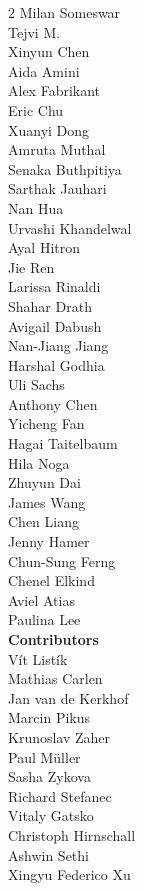 \begin{multicols}{2}
Milan Someswar \\
Tejvi M. \\
Xinyun Chen \\
Aida Amini \\
Alex Fabrikant \\
Eric Chu \\
Xuanyi Dong \\
Amruta Muthal \\
Senaka Buthpitiya \\
Sarthak Jauhari \\
Nan Hua \\
Urvashi Khandelwal \\
Ayal Hitron \\
Jie Ren \\
Larissa Rinaldi \\
Shahar Drath \\
Avigail Dabush \\
Nan-Jiang Jiang \\
Harshal Godhia \\
Uli Sachs \\
Anthony Chen \\
Yicheng Fan \\
Hagai Taitelbaum \\
Hila Noga \\
Zhuyun Dai \\
James Wang \\
Chen Liang \\
Jenny Hamer \\
Chun-Sung Ferng \\
Chenel Elkind \\
Aviel Atias \\
Paulina Lee \\
\textbf{Contributors} \\
Vít Listík \\
Mathias Carlen \\
Jan van de Kerkhof \\
Marcin Pikus \\
Krunoslav Zaher \\
Paul Müller \\
Sasha Zykova \\
Richard Stefanec \\
Vitaly Gatsko \\
Christoph Hirnschall \\
Ashwin Sethi \\
Xingyu Federico Xu \\

\end{multicols}
